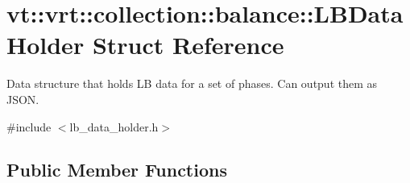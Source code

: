 \hypertarget{structvt_1_1vrt_1_1collection_1_1balance_1_1_l_b_data_holder}{}\section{vt\+:\+:vrt\+:\+:collection\+:\+:balance\+:\+:L\+B\+Data\+Holder Struct Reference}
\label{structvt_1_1vrt_1_1collection_1_1balance_1_1_l_b_data_holder}


Data structure that holds LB data for a set of phases. Can output them as J\+S\+ON.  




{\ttfamily \#include $<$lb\+\_\+data\+\_\+holder.\+h$>$}

\subsection*{Public Member Functions}
